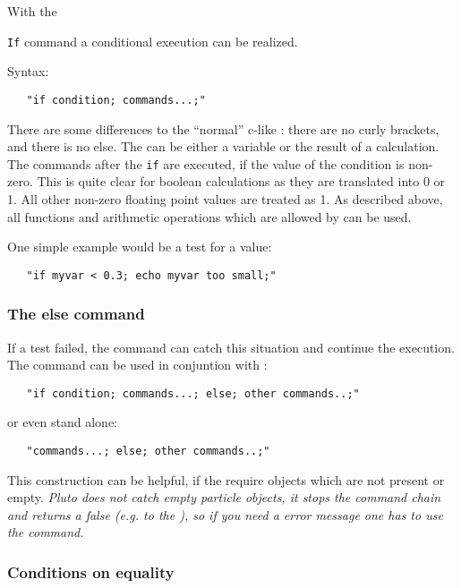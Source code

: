 With the {{\tt If} command a conditional execution can be realized.

Syntax:

\begin{verbatim}
   "if condition; commands...;"
\end{verbatim}

There are some differences to the ``normal'' c-like : there are
no curly brackets, and there is no else.  The  can be
either a variable or the result of a calculation.  The commands after
the {\tt if} are executed, if the value of the condition is
non-zero. This is quite clear for boolean calculations as they are
translated into 0 or 1. All other non-zero floating point values are
treated as 1.
As described above, all functions and
arithmetic operations which are allowed by  can be used.

One simple example would be a test for a value:


\begin{verbatim}
   "if myvar < 0.3; echo myvar too small;"
\end{verbatim}

\subsubsection{The else command}\label{else}

If a test failed, the  command can catch this situation and
continue the execution. The  command can be used in conjuntion
with :

\begin{verbatim}
   "if condition; commands...; else; other commands..;"
\end{verbatim}

or even stand alone:

\begin{verbatim}
   "commands...; else; other commands..;"
\end{verbatim}

This construction can be helpful, if the  require objects
which are not present or empty. {\it Pluto does not catch empty
particle objects, it stops the command chain and returns a false
(e.g. to the ), so if you need a error message one has to use the  command.}

\subsubsection{Conditions on equality}

}
